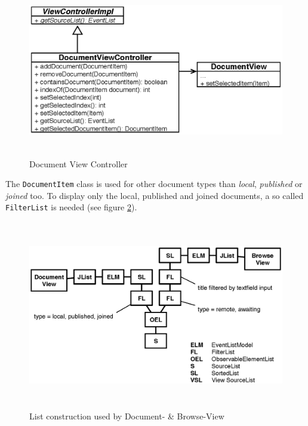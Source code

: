 \begin{figure}[H]
\begin{center}
  \includegraphics[height=2.99in, width=5.62in]{../images/finalreport/application_documentview.eps}
\caption{Document View Controller}
\label{application_documentview}
\end{center}
\end{figure}

The \texttt{DocumentItem} class is used for other document types than \emph{local}, \emph{published} or \emph{joined} too. To display only the local, published and joined documents, a so called \texttt{FilterList} is needed (see figure \ref{application_list_usage}).

\begin{figure}[H]
\begin{center}
  \includegraphics[height=3.24in, width=5.77in]{../images/finalreport/application_listusage.eps}
\caption{List construction used by Document- \& Browse-View}
\end{center}
\label{application_list_usage}
\end{figure} 

